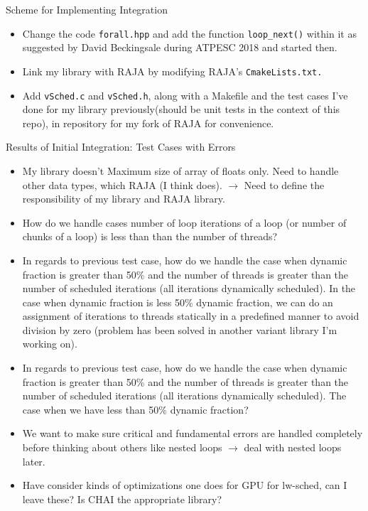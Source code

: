 \documentclass{beamer}
\begin{document}
\begin{frame}{Scheme for Implementing Integration}
\begin{itemize}
\item Change the code {\tt forall.hpp} and add the function {\tt loop\_next()} within it as suggested by David Beckingsale during ATPESC 2018 and started then.
\item Link my library with RAJA by modifying RAJA's {\tt CmakeLists.txt.}
\item Add {\tt vSched.c} and {\tt vSched.h}, along with a Makefile and the test cases I've done for my library previously(should be unit tests in the context of this repo), in repository for my fork of RAJA for convenience.
\end{itemize}
\end{frame}

\begin{frame}[allowframebreaks]{Results of Initial Integration: Test Cases with Errors}
\begin{itemize}
\small \item \small My library doesn't Maximum size of array of floats only. Need to handle other data types, which RAJA (I think does). $\rightarrow$ Need to define the responsibility of my library and RAJA library.
\item \small How do we handle cases number of loop iterations of a loop (or number of chunks of a loop) is less than than the number of threads?
\item \small In regards to previous test case, how do we handle the case when dynamic fraction is greater than 50\% and the number of threads is greater than the number of scheduled iterations (all iterations dynamically scheduled). In the case when dynamic fraction is less 50\% dynamic fraction, we can do an assignment of iterations to threads statically in a predefined manner to avoid division by zero (problem has been solved in another variant library I'm working on).
\item \small In regards to previous test case, how do we handle the case when dynamic fraction is greater than 50\% and the number of threads is greater than the number of scheduled iterations (all iterations dynamically scheduled). The case when we have less than 50\% dynamic fraction?
\item \small We want to make sure critical and fundamental errors are handled completely before thinking about others like nested loops $\rightarrow$ deal with nested loops later. 
\item \small Have consider kinds of optimizations one does for GPU for lw-sched, can I leave these? Is CHAI the appropriate library?
\end{itemize}
\end{frame}
\end{document}
